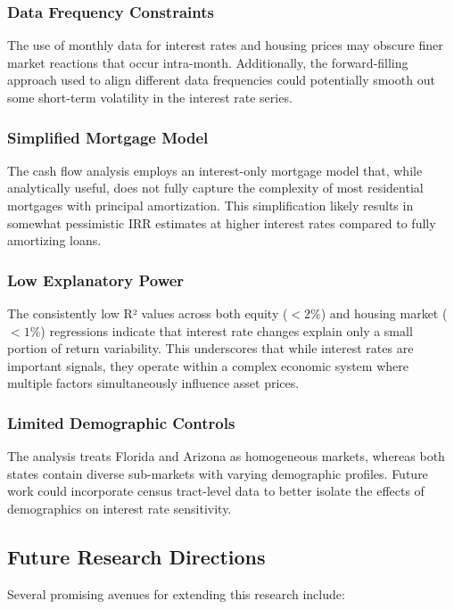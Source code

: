 \documentclass[12pt, stu, abstract]{apa7}
\begin{document}
\subsubsection{Data Frequency Constraints}
The use of monthly data for interest rates and housing prices may obscure finer market reactions that occur intra-month. Additionally, the forward-filling approach used to align different data frequencies could potentially smooth out some short-term volatility in the interest rate series.

\subsubsection{Simplified Mortgage Model}
The cash flow analysis employs an interest-only mortgage model that, while analytically useful, does not fully capture the complexity of most residential mortgages with principal amortization. This simplification likely results in somewhat pessimistic IRR estimates at higher interest rates compared to fully amortizing loans.

\subsubsection{Low Explanatory Power}
The consistently low R² values across both equity ($< 2\%$) and housing market ($< 1\%$) regressions indicate that interest rate changes explain only a small portion of return variability. This underscores that while interest rates are important signals, they operate within a complex economic system where multiple factors simultaneously influence asset prices.

\subsubsection{Limited Demographic Controls}
The analysis treats Florida and Arizona as homogeneous markets, whereas both states contain diverse sub-markets with varying demographic profiles. Future work could incorporate census tract-level data to better isolate the effects of demographics on interest rate sensitivity.

\subsection{Future Research Directions}
Several promising avenues for extending this research include:
\end{document}
